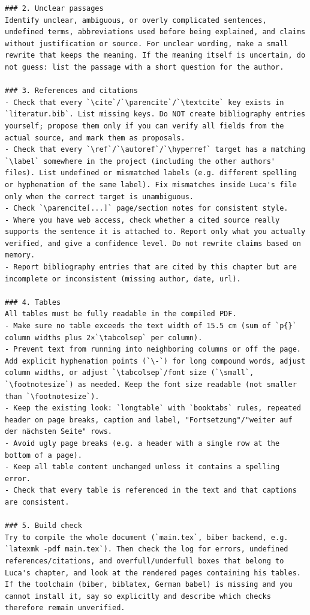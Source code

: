 \begin{lstlisting}
### 2. Unclear passages
Identify unclear, ambiguous, or overly complicated sentences, undefined terms, abbreviations used before being explained, and claims without justification or source. For unclear wording, make a small rewrite that keeps the meaning. If the meaning itself is uncertain, do not guess: list the passage with a short question for the author.
 
### 3. References and citations
- Check that every `\cite`/`\parencite`/`\textcite` key exists in `literatur.bib`. List missing keys. Do NOT create bibliography entries yourself; propose them only if you can verify all fields from the actual source, and mark them as proposals.
- Check that every `\ref`/`\autoref`/`\hyperref` target has a matching `\label` somewhere in the project (including the other authors' files). List undefined or mismatched labels (e.g. different spelling or hyphenation of the same label). Fix mismatches inside Luca's file only when the correct target is unambiguous.
- Check `\parencite[...]` page/section notes for consistent style.
- Where you have web access, check whether a cited source really supports the sentence it is attached to. Report only what you actually verified, and give a confidence level. Do not rewrite claims based on memory.
- Report bibliography entries that are cited by this chapter but are incomplete or inconsistent (missing author, date, url).
 
### 4. Tables
All tables must be fully readable in the compiled PDF.
- Make sure no table exceeds the text width of 15.5 cm (sum of `p{}` column widths plus 2×`\tabcolsep` per column).
- Prevent text from running into neighboring columns or off the page. Add explicit hyphenation points (`\-`) for long compound words, adjust column widths, or adjust `\tabcolsep`/font size (`\small`, `\footnotesize`) as needed. Keep the font size readable (not smaller than `\footnotesize`).
- Keep the existing look: `longtable` with `booktabs` rules, repeated header on page breaks, caption and label, "Fortsetzung"/"weiter auf der nächsten Seite" rows.
- Avoid ugly page breaks (e.g. a header with a single row at the bottom of a page).
- Keep all table content unchanged unless it contains a spelling error.
- Check that every table is referenced in the text and that captions are consistent.
 
### 5. Build check
Try to compile the whole document (`main.tex`, biber backend, e.g. `latexmk -pdf main.tex`). Then check the log for errors, undefined references/citations, and overfull/underfull boxes that belong to Luca's chapter, and look at the rendered pages containing his tables. If the toolchain (biber, biblatex, German babel) is missing and you cannot install it, say so explicitly and describe which checks therefore remain unverified.
 

\end{lstlisting}
